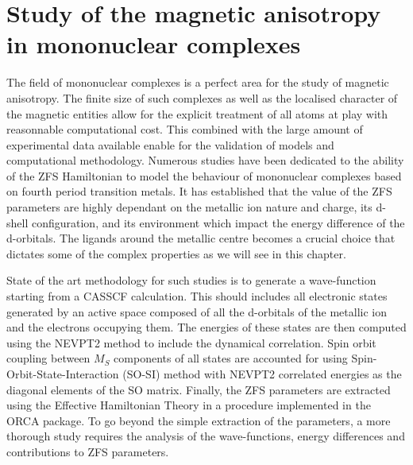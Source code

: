 \documentclass[12pt]{report}
\numberwithin{equation}{section}
\begin{document}
\chapter{Study of the magnetic anisotropy in mononuclear complexes}
\label{MonoNucl}

The field of mononuclear complexes is a perfect area for the study of magnetic anisotropy. 
The finite size of such complexes as well as the localised character of the magnetic entities allow for the explicit treatment of all atoms at play with reasonnable computational cost.
This combined with the large amount of experimental data available enable for the validation of models and computational methodology.
Numerous studies have been dedicated to the ability of the ZFS Hamiltonian to model the behaviour of mononuclear complexes based on fourth period transition metals.
It has established that the value of the ZFS parameters are highly dependant on the metallic ion nature and charge, its d-shell configuration, and its environment which impact the energy difference of the d-orbitals.
The ligands around the metallic centre becomes a crucial choice that dictates some of the complex properties as we will see in this chapter.
\par State of the art methodology for such studies is to generate a wave-function starting from a CASSCF calculation. This should includes all electronic states generated by an active space composed of all the d-orbitals of the metallic ion and the electrons occupying them. 
The energies of these states are then computed using the NEVPT2 method to include the dynamical correlation.
Spin orbit coupling between $M_S$ components of all states are accounted for using Spin-Orbit-State-Interaction (SO-SI) method with NEVPT2 correlated energies as the diagonal elements of the SO matrix.
Finally, the ZFS parameters are extracted using the Effective Hamiltonian Theory in a procedure implemented in the ORCA package.
To go beyond the simple extraction of the parameters, a more thorough study requires the analysis of the wave-functions, energy differences and contributions to ZFS parameters.
\end{document}

